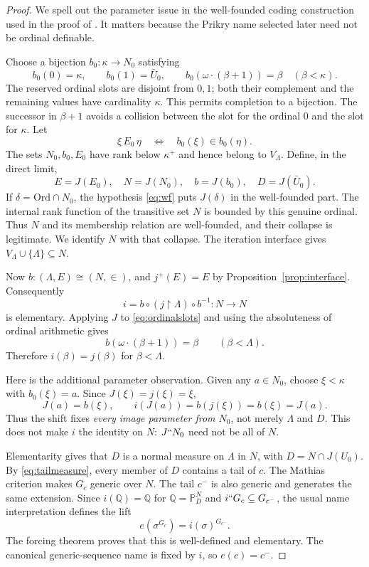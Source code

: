 \documentclass[11pt,letterpaper]{article}
\theoremstyle{definition}
\newcommand{\Ord}{\mathrm{Ord}}
\newcommand{\restr}{\mathbin{\upharpoonright}}
\newcommand{\PP}{\mathbb P}
\newcommand{\QQ}{\mathbb Q}
\begin{document}
\begin{proof}
We spell out the parameter issue in the well-founded coding construction
used in the proof of \cite[Theorem~5.4]{abgl}. It matters because the
Prikry name selected later need not be ordinal definable.

Choose a bijection $b_0:\kappa\to N_0$ satisfying
\begin{equation}\label{eq:ordinalslots}
 b_0(0)=\kappa,\qquad b_0(1)=\bar U_0,\qquad
 b_0(\omega\cdot(\beta+1))=\beta\quad(\beta<\kappa).
\end{equation}
The reserved ordinal slots are disjoint from $0,1$; both their complement
and the remaining values have cardinality $\kappa$. This permits completion
to a bijection. The successor in $\beta+1$ avoids a collision between the
slot for the ordinal $0$ and the slot for $\kappa$.
Let
\[
 \xi\,E_0\,\eta\quad\Longleftrightarrow\quad b_0(\xi)\in b_0(\eta).
\]
The sets $N_0,b_0,E_0$ have rank below $\kappa^+$ and hence belong to
$V_\Lambda$. Define, in the direct limit,
\[
 E=J(E_0),\quad N=J(N_0),\quad b=J(b_0),\quad D=J(\bar U_0).
\]
If $\delta=\Ord\cap N_0$, the hypothesis \eqref{eq:wf} puts
$J(\delta)$ in the well-founded part. The internal rank function of the
transitive set $N$ is bounded by this genuine ordinal. Thus $N$ and its
membership relation are well-founded, and their collapse is legitimate.
We identify $N$ with that collapse. The iteration interface gives
$V_\Lambda\cup\{\Lambda\}\subseteq N$.

Now $b:(\Lambda,E)\cong(N,\in)$, and $j^+(E)=E$ by
Proposition~\ref{prop:interface}. Consequently
\[
 i=b\circ(j\restr\Lambda)\circ b^{-1}:N\to N
\]
is elementary. Applying $J$ to \eqref{eq:ordinalslots} and using the
absoluteness of ordinal arithmetic gives
\[
 b(\omega\cdot(\beta+1))=\beta\qquad(\beta<\Lambda).
\]
Therefore $i(\beta)=j(\beta)$ for $\beta<\Lambda$.

Here is the additional parameter observation. Given any $a\in N_0$,
choose $\xi<\kappa$ with $b_0(\xi)=a$. Since $J(\xi)=j(\xi)=\xi$,
\begin{equation}\label{eq:fixedrange}
 J(a)=b(\xi),\qquad i(J(a))=b(j(\xi))=b(\xi)=J(a).
\end{equation}
Thus the shift fixes \emph{every image parameter from $N_0$}, not merely
$\Lambda$ and $D$. This does not make $i$ the identity on $N$:
$J``N_0$ need not be all of $N$.

Elementarity gives that $D$ is a normal measure on $\Lambda$ in $N$,
with $D=N\cap J(U_0)$. By \eqref{eq:tailmeasure}, every member of $D$
contains a tail of $c$. The Mathias criterion makes $G_c$ generic over
$N$. The tail $c^-$ is also generic and generates the same extension.
Since $i(\QQ)=\QQ$ for $\QQ=\PP_D^N$ and $i``G_c\subseteq G_{c^-}$,
the usual name interpretation defines the lift
\begin{equation}\label{eq:lift}
 e(\sigma^{G_c})=i(\sigma)^{G_{c^-}}.
\end{equation}
The forcing theorem proves that this is well-defined and elementary.
The canonical generic-sequence name is fixed by $i$, so $e(c)=c^-$.


\end{proof}
\end{document}
